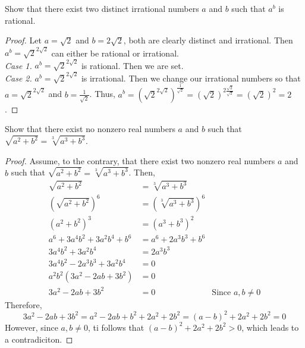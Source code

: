 \documentclass[12pt]{article}
\newenvironment{problem}[2][Problem]{\begin{trivlist}
		\item[\hskip \labelsep {\bfseries #1}\hskip \labelsep {\bfseries #2.}]}{\end{trivlist}}
\begin{document}
	\begin{problem}{42}
		Show that there exist two distinct irrational numbers $a$ and $b$ such that $a^{b}$ is rational.
		\begin{proof}
			Let $a = \sqrt{2}$ and $b = 2\sqrt{2}$, both are clearly distinct and irrational. Then $a^{b} = \sqrt{2}^{2\sqrt{2}}$ can either be rational or irrational.\\
			\textit{Case 1.} $a^{b} = \sqrt{2}^{2\sqrt{2}}$ is rational. Then we are set.\\
			\textit{Case 2.} $a^{b} = \sqrt{2}^{2\sqrt{2}}$ is irrational. Then we change our irrational numbers so that $a = \sqrt{2}^{2\sqrt{2}}$ and $b = \frac{1}{\sqrt{2}}$. Thus, $a^{b} = \left(\sqrt{2}^{2\sqrt{2}}\right)^{\frac{1}{\sqrt{2}}} = (\sqrt{2})^{2\frac{\sqrt{2}}{\sqrt{2}}} = (\sqrt{2})^{2} = 2$.
		\end{proof}
	\end{problem}

	\begin{problem}{43}
		Show that there exist no nonzero real numbers $a$ and $b$ such that $\sqrt{a^{2}+b^{2}} = \sqrt[3]{a^{3}+b^{3}}$.
		\begin{proof}
			Assume, to the contrary, that there exist two nonzero real numbers $a$ and $b$ such that $\sqrt{a^{2}+b^{2}} = \sqrt[3]{a^{3}+b^{3}}$. Then, 
			\begin{align*}
				\sqrt{a^{2}+b^{2}} &= \sqrt[3]{a^{3}+b^{3}}\\
				(\sqrt{a^{2}+b^{2}})^{6} &= (\sqrt[3]{a^{3}+b^{3}})^{6}\\
				(a^{2}+b^{2})^{3} &= (a^{3}+b^{3})^{2}\\
				a^{6} + 3a^{4}b^{2} + 3a^{2}b^{4} + b^{6} &= a^{6}+2a^{3}b^{3}+b^{6}\\
				3a^{4}b^{2} + 3a^{2}b^{4} &= 2a^{3}b^{3}\\
				3a^{4}b^{2} - 2a^{3}b^{3} + 3a^{2}b^{4} &= 0\\
				a^{2}b^{2}(3a^{2}-2ab+3b^{2}) &= 0\\
				3a^{2}-2ab+3b^{2} &= 0   &\text{Since }a,b\neq 0
			\end{align*}
		Therefore,
		\begin{equation}
			3a^{2}-2ab+3b^{2} = a^{2} -2ab +b^{2} +2a^{2}+2b^{2} = (a-b)^{2} +2a^{2}+2b^{2} =0
		\end{equation}
	However, since $a,b\neq 0$, ti follows that $(a-b)^{2} +2a^{2}+2b^{2} > 0$, which leads to a contradiciton.
		\end{proof}
	\end{problem}
\end{document}
